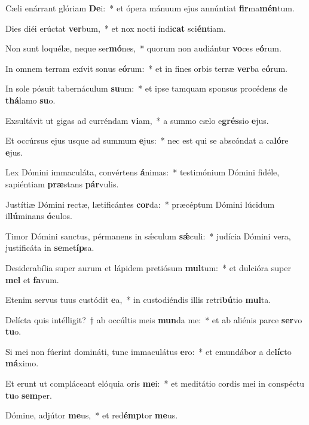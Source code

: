 \item Cæli enárrant glóriam \textbf{De}i:~* et ópera mánuum ejus annúntiat \textbf{fir}ma\textbf{mén}tum.
\item Dies diéi erúctat \textbf{ver}bum,~* et nox nocti índi\textbf{cat} sci\textbf{én}tiam.
\item Non sunt loquélæ, neque ser\textbf{mó}nes,~* quorum non audiántur \textbf{vo}ces e\textbf{ó}rum.
\item In omnem terram exívit sonus e\textbf{ó}rum:~* et in fines orbis terræ \textbf{ver}ba e\textbf{ó}rum.
\item In sole pósuit tabernáculum \textbf{su}um:~* et ipse tamquam sponsus procédens de \textbf{thá}lamo \textbf{su}o.
\item Exsultávit ut gigas ad curréndam \textbf{vi}am,~* a summo cælo e\textbf{grés}sio \textbf{e}jus.
\item Et occúrsus ejus usque ad summum \textbf{e}jus:~* nec est qui se abscóndat a ca\textbf{ló}re \textbf{e}jus.
\item Lex Dómini immaculáta, convértens \textbf{á}nimas:~* testimónium Dómini fidéle, sapiéntiam \textbf{præ}stans \textbf{pár}vulis.
\item Justítiæ Dómini rectæ, lætificántes \textbf{cor}da:~* præcéptum Dómini lúcidum il\textbf{lú}minans \textbf{ó}culos.
\item Timor Dómini sanctus, pérmanens in sǽculum \textbf{sǽ}culi:~* judícia Dómini vera, justificáta in \textbf{se}met\textbf{íp}sa.
\item Desiderabília super aurum et lápidem pretiósum \textbf{mul}tum:~* et dulcióra super \textbf{mel} et \textbf{fa}vum.
\item Etenim servus tuus custódit \textbf{e}a,~* in custodiéndis illis retri\textbf{bú}tio \textbf{mul}ta.
\item Delícta quis intélligit?~† ab occúltis meis \textbf{mun}da me:~* et ab aliénis parce \textbf{ser}vo \textbf{tu}o.
\item Si mei non fúerint domináti, tunc immaculátus \textbf{e}ro:~* et emundábor a de\textbf{líc}to \textbf{má}ximo.
\item Et erunt ut compláceant elóquia oris \textbf{me}i:~* et meditátio cordis mei in conspéctu \textbf{tu}o \textbf{sem}per.
\item Dómine, adjútor \textbf{me}us,~* et red\textbf{émp}tor \textbf{me}us.

